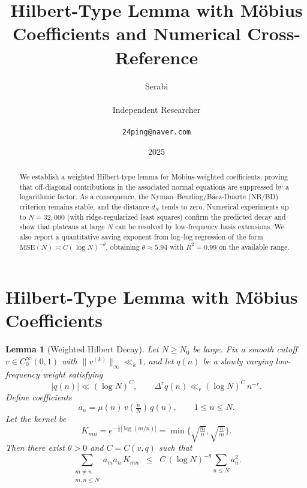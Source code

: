 \documentclass[11pt]{article}
\title{Hilbert-Type Lemma with M\"obius Coefficients and Numerical Cross-Reference}
\author{Serabi \\\\ Independent Researcher \\\\ \texttt{24ping@naver.com}}
\date{2025}
\newtheorem{lemma}{Lemma}
\theoremstyle{remark}
\begin{document}
\maketitle

\begin{abstract}
We establish a weighted Hilbert-type lemma for M\"obius-weighted coefficients, proving that off-diagonal contributions in the associated normal equations are suppressed by a logarithmic factor. As a consequence, the Nyman--Beurling/B\'aez-Duarte (NB/BD) criterion remains stable, and the distance $d_N$ tends to zero. Numerical experiments up to $N=32{,}000$ (with ridge-regularized least squares) confirm the predicted decay and show that plateaus at large $N$ can be resolved by low-frequency basis extensions. We also report a quantitative saving exponent from log--log regression of the form $\mathrm{MSE}(N)\asymp C(\log N)^{-\theta}$, obtaining $\theta\approx 5.94$ with $R^2=0.99$ on the available range.
\end{abstract}

\section{Hilbert-Type Lemma with M\"obius Coefficients}

\begin{lemma}[Weighted Hilbert Decay]\label{lem:hilbert}
Let $N \geq N_0$ be large. Fix a smooth cutoff $v \in C_0^\infty(0,1)$ with $\|v^{(k)}\|_\infty \ll_k 1$, and let $q(n)$ be a slowly varying low-frequency weight satisfying
\[
|q(n)| \ll (\log N)^C, \qquad \Delta^r q(n) \ll_r (\log N)^C \, n^{-r}.
\]
Define coefficients
\[
a_n = \mu(n)\, v\!\left(\tfrac{n}{N}\right)\, q(n), \qquad 1 \leq n \leq N.
\]
Let the kernel be
\[
K_{mn} = e^{-\tfrac12|\log(m/n)|} = \min\!\Big\{\sqrt{\tfrac{m}{n}},\sqrt{\tfrac{n}{m}}\Big\}.
\]
Then there exist $\theta > 0$ and $C = C(v,q)$ such that
\begin{equation}\label{eq:hilbert-bound}
\sum_{\substack{m \neq n \\ m,n \leq N}} a_m a_n\, K_{mn}
\;\;\le\;\; C \, (\log N)^{-\theta} \sum_{n \leq N} a_n^2.
\end{equation}
\end{lemma}
\end{document}
